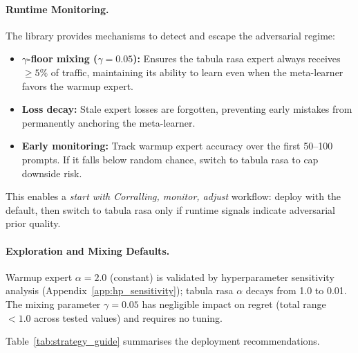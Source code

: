 \paragraph{Runtime Monitoring.}
The library provides mechanisms to detect and escape the adversarial
regime:

\begin{itemize}[nosep]
    \item \textbf{$\gamma$-floor mixing ($\gamma{=}0.05$):}
    Ensures the tabula rasa expert always receives $\geq 5\%$ of traffic,
    maintaining its ability to learn even when the meta-learner favors
    the warmup expert.
    \item \textbf{Loss decay:}
    Stale expert losses are forgotten, preventing early mistakes from
    permanently anchoring the meta-learner.
    \item \textbf{Early monitoring:}
    Track warmup expert accuracy over the first 50--100 prompts.
    If it falls below random chance, switch to tabula rasa to cap
    downside risk.
\end{itemize}

This enables a \emph{start with Corralling, monitor, adjust} workflow:
deploy with the default, then switch to tabula rasa only if runtime
signals indicate adversarial prior quality.

\paragraph{Exploration and Mixing Defaults.}
Warmup expert $\alpha{=}2.0$ (constant) is validated by hyperparameter
sensitivity analysis (Appendix~\ref{app:hp_sensitivity}); tabula rasa
$\alpha$ decays from 1.0 to 0.01.  The mixing parameter $\gamma{=}0.05$
has negligible impact on regret (total range ${<}1.0$ across tested
values) and requires no tuning.

Table~\ref{tab:strategy_guide} summarises the deployment recommendations.
